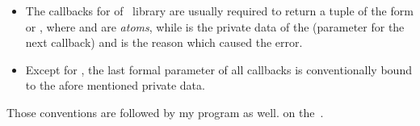 \begin{itemize}

    \item   The callbacks for  of \OTP\ library are
            usually required to return a tuple of the form 
            or , where  and  are
            \emph{atoms}, while  is the private data of the
             (parameter for the next callback)
            and  is the reason which caused the error.

    \item   Except for , the last formal parameter of all
             callbacks is conventionally
            bound to the afore mentioned private data.
\end{itemize}

Those conventions are followed by my program as well.
 on the~.
